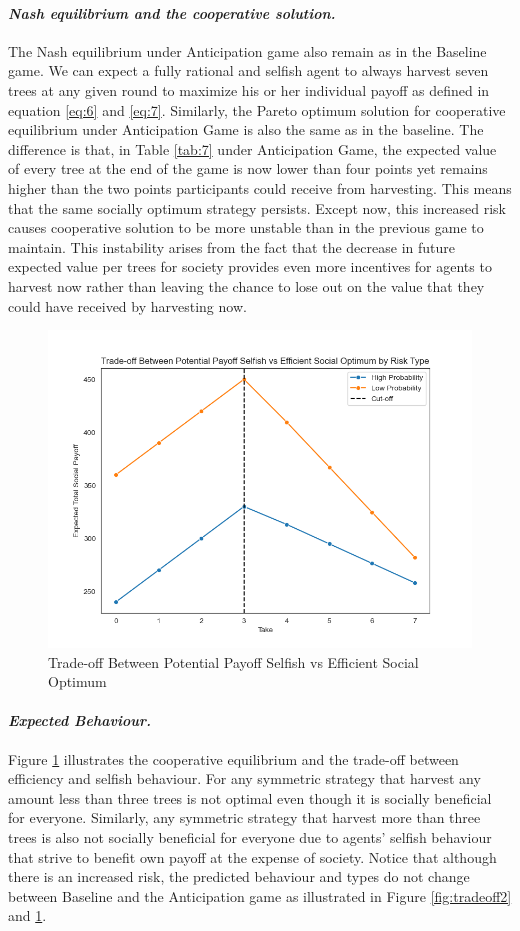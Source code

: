 \paragraph{\textit{Nash equilibrium and the cooperative solution.}}
The Nash equilibrium under Anticipation game also remain as in the Baseline game. We can expect a fully rational and selfish agent to always harvest seven trees at any given round to maximize his or her individual payoff as defined in equation \ref{eq:6} and \ref{eq:7}. Similarly, the Pareto optimum solution for cooperative equilibrium under Anticipation Game is also the same as in the baseline. The difference is that, in Table \ref{tab:7} under Anticipation Game, the expected value of every tree at the end of the game is now lower than four points yet remains higher than the two points participants could receive from harvesting. This means that the same socially optimum strategy persists. Except now, this increased risk causes cooperative solution to be more unstable than in the previous game to maintain. This instability arises from the fact that the decrease in future expected value per trees for society provides even more incentives for agents to harvest now rather than leaving the chance to lose out on the value that they could have received by harvesting now.
 \begin{figure}[H]
  \centering
  \includegraphics[width=0.6\linewidth]{../bld/graphs/0.Tradeoff2.png}
  \caption{Trade-off Between Potential Payoff Selfish vs Efficient Social Optimum}
  \label{fig:tradeoff3}
\end{figure}
 \paragraph{\textit{Expected Behaviour.}}

 Figure \ref{fig:tradeoff3} illustrates the cooperative equilibrium and the trade-off between efficiency and selfish behaviour. For any symmetric strategy that harvest any amount less than three trees is not optimal even though it is socially beneficial for everyone. Similarly, any symmetric strategy that harvest more than three trees is also not socially beneficial for everyone due to agents' selfish behaviour that strive to benefit own payoff at the expense of society. Notice that although there is an increased risk, the predicted behaviour and types do not change between Baseline and the Anticipation game as illustrated in Figure \ref{fig:tradeoff2} and \ref{fig:tradeoff3}.
